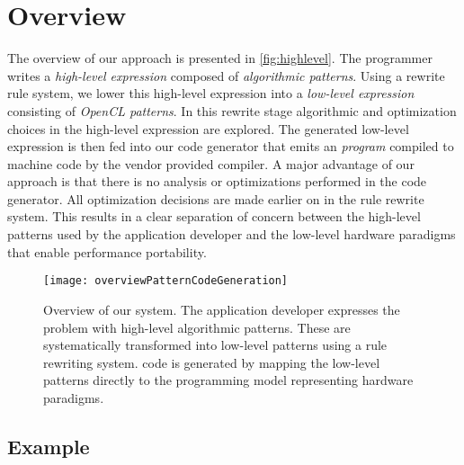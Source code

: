 \section{Overview}

The overview of our approach is presented in \autoref{fig:highlevel}.
The programmer writes a \emph{high-level expression} composed of \emph{algorithmic patterns}.
Using a rewrite rule system, we lower this high-level expression into a \emph{low-level expression} consisting of \emph{OpenCL patterns}.
In this rewrite stage algorithmic and optimization choices in the high-level expression are explored.
The generated low-level expression is then fed into our code generator that emits an \emph{\OpenCL program} compiled to machine code by the vendor provided \OpenCL compiler.
A major advantage of our approach is that there is no analysis or optimizations performed in the code generator.
All optimization decisions are made earlier on in the rule rewrite system.
This results in a clear separation of concern between the high-level patterns used by the application developer and the low-level hardware paradigms that enable performance portability.

\begin{figure}[t]
\centering
\texttt{[image: overviewPatternCodeGeneration]}
\caption{
Overview of our system.
The application developer expresses the problem with high-level algorithmic patterns.
These are systematically transformed into low-level \OpenCL patterns using a rule rewriting system.
\OpenCL code is generated by mapping the low-level patterns directly to the \OpenCL programming model representing hardware paradigms.
\vspace{-1em}}
\label{fig:highlevel}
\end{figure}



\subsection{Example}

